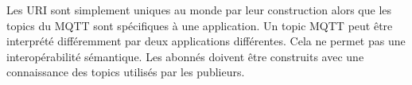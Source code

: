 Les URI sont simplement uniques au monde par leur construction alors que les topics du MQTT sont spécifiques à une application. Un topic MQTT peut être interprété différemment par deux applications différentes. Cela ne permet pas une interopérabilité sémantique. Les abonnés doivent être construits avec une connaissance des topics utilisés par les publieurs.
